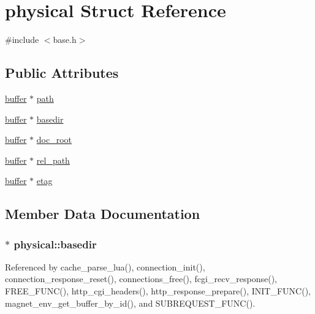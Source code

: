 \hypertarget{structphysical}{\section{physical Struct Reference}
\label{structphysical}
}


{\ttfamily \#include $<$base.\-h$>$}

\subsection*{Public Attributes}
\begin{DoxyCompactItemize}
\item 
\hyperlink{structbuffer}{buffer} $\ast$ \hyperlink{structphysical_ab8904c540bcd84c8a18ec85ab198910d}{path}
\item 
\hyperlink{structbuffer}{buffer} $\ast$ \hyperlink{structphysical_a83b1ef7d12666f8fbb1fc49c744e2259}{basedir}
\item 
\hyperlink{structbuffer}{buffer} $\ast$ \hyperlink{structphysical_a98672acc301e5fb96e694eadca486234}{doc\-\_\-root}
\item 
\hyperlink{structbuffer}{buffer} $\ast$ \hyperlink{structphysical_a5122d5a7e9aa4be1b5719701571c172d}{rel\-\_\-path}
\item 
\hyperlink{structbuffer}{buffer} $\ast$ \hyperlink{structphysical_a9fbba28b809c3d23be048f38a0a157e8}{etag}
\end{DoxyCompactItemize}


\subsection{Member Data Documentation}
\hypertarget{structphysical_a83b1ef7d12666f8fbb1fc49c744e2259}{
\subsubsection[{basedir}]{$\ast$ physical\-::basedir}}\label{structphysical_a83b1ef7d12666f8fbb1fc49c744e2259}


Referenced by cache\-\_\-parse\-\_\-lua(), connection\-\_\-init(), connection\-\_\-response\-\_\-reset(), connections\-\_\-free(), fcgi\-\_\-recv\-\_\-response(), F\-R\-E\-E\-\_\-\-F\-U\-N\-C(), http\-\_\-cgi\-\_\-headers(), http\-\_\-response\-\_\-prepare(), I\-N\-I\-T\-\_\-\-F\-U\-N\-C(), magnet\-\_\-env\-\_\-get\-\_\-buffer\-\_\-by\-\_\-id(), and S\-U\-B\-R\-E\-Q\-U\-E\-S\-T\-\_\-\-F\-U\-N\-C().


